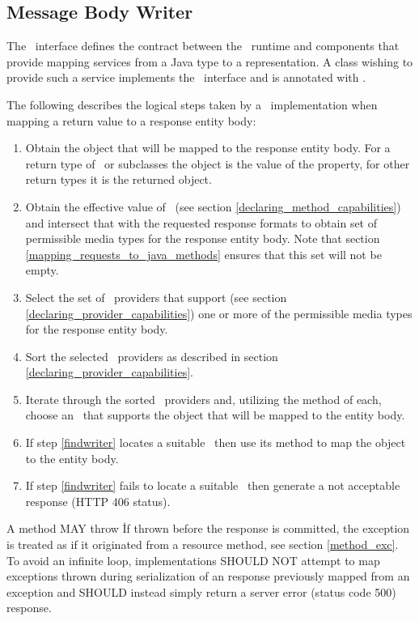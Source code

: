 \subsection{Message Body Writer}
\label{message_body_writer}

The \MsgWrite\ interface defines the contract between the \jaxrs\ runtime and components that provide mapping services from a Java type to a representation. A class wishing to provide such a service implements the \MsgWrite\ interface and is annotated with \Provider.

The following describes the logical steps taken by a \jaxrs\ implementation when mapping a return value to a response entity body:

\begin{enumerate}
\item Obtain the object that will be mapped to the response entity body. For a return type of \Response\ or subclasses the object is the value of the  property, for other return types it is the returned object.
\item Obtain the effective value of \ProduceMime\ (see section \ref{declaring_method_capabilities}) and intersect that with the requested response formats to obtain set of permissible media types for the response entity body. Note that section \ref{mapping_requests_to_java_methods} ensures that this set will not be empty.
\item Select the set of \MsgWrite\ providers that support (see section \ref{declaring_provider_capabilities}) one or more of the permissible media types for the response entity body.
\item Sort the selected \MsgWrite\ providers as described in section \ref{declaring_provider_capabilities}.
\item\label{findwriter} Iterate through the sorted \MsgWrite\ providers and, utilizing the  method of each, choose an \MsgWrite\ that supports the object that will be mapped to the entity body.
\item If step \ref{findwriter} locates a suitable \MsgWrite\ then use its  method to map the object to the entity body.
\item If step \ref{findwriter} fails to locate a suitable \MsgWrite\ then generate a not acceptable response (HTTP 406 status).
\end{enumerate}

A \MsgWrite{} method MAY throw \WebAppExc\. If thrown before the response is committed, the exception is treated as if it originated from a resource method, see section \ref{method_exc}. To avoid an infinite loop, implementations SHOULD NOT attempt to map exceptions thrown during serialization of an response previously mapped from an exception and SHOULD instead simply return a server error (status code 500) response.

